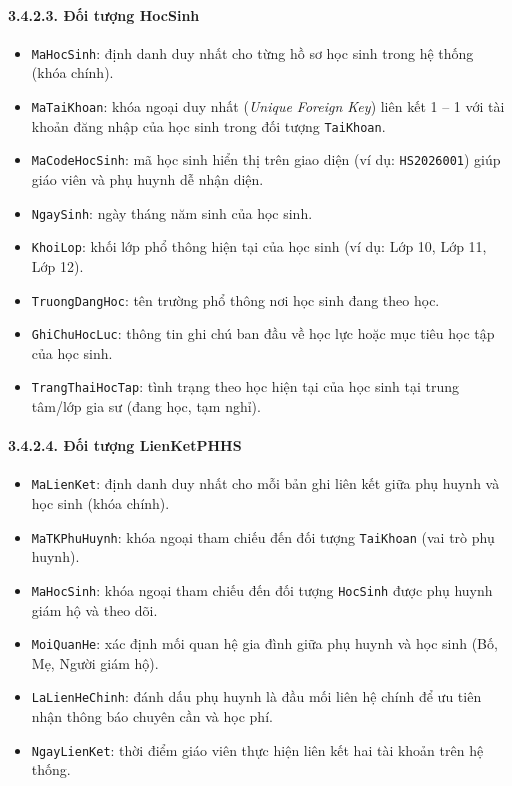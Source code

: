 \documentclass[12pt,a4paper]{article}
\begin{document}
\paragraph{3.4.2.3. Đối tượng HocSinh}\mbox{}
\begin{itemize}\setlength{\itemsep}{2pt}\setlength{\parskip}{0pt}
    \item \texttt{MaHocSinh}: định danh duy nhất cho từng hồ sơ học sinh trong hệ thống (khóa chính).
    \item \texttt{MaTaiKhoan}: khóa ngoại duy nhất (\textit{Unique Foreign Key}) liên kết 1 -- 1 với tài khoản đăng nhập của học sinh trong đối tượng \texttt{TaiKhoan}.
    \item \texttt{MaCodeHocSinh}: mã học sinh hiển thị trên giao diện (ví dụ: \texttt{HS2026001}) giúp giáo viên và phụ huynh dễ nhận diện.
    \item \texttt{NgaySinh}: ngày tháng năm sinh của học sinh.
    \item \texttt{KhoiLop}: khối lớp phổ thông hiện tại của học sinh (ví dụ: Lớp 10, Lớp 11, Lớp 12).
    \item \texttt{TruongDangHoc}: tên trường phổ thông nơi học sinh đang theo học.
    \item \texttt{GhiChuHocLuc}: thông tin ghi chú ban đầu về học lực hoặc mục tiêu học tập của học sinh.
    \item \texttt{TrangThaiHocTap}: tình trạng theo học hiện tại của học sinh tại trung tâm/lớp gia sư (đang học, tạm nghỉ).
\end{itemize}

\paragraph{3.4.2.4. Đối tượng LienKetPHHS}\mbox{}
\begin{itemize}\setlength{\itemsep}{2pt}\setlength{\parskip}{0pt}
    \item \texttt{MaLienKet}: định danh duy nhất cho mỗi bản ghi liên kết giữa phụ huynh và học sinh (khóa chính).
    \item \texttt{MaTKPhuHuynh}: khóa ngoại tham chiếu đến đối tượng \texttt{TaiKhoan} (vai trò phụ huynh).
    \item \texttt{MaHocSinh}: khóa ngoại tham chiếu đến đối tượng \texttt{HocSinh} được phụ huynh giám hộ và theo dõi.
    \item \texttt{MoiQuanHe}: xác định mối quan hệ gia đình giữa phụ huynh và học sinh (Bố, Mẹ, Người giám hộ).
    \item \texttt{LaLienHeChinh}: đánh dấu phụ huynh là đầu mối liên hệ chính để ưu tiên nhận thông báo chuyên cần và học phí.
    \item \texttt{NgayLienKet}: thời điểm giáo viên thực hiện liên kết hai tài khoản trên hệ thống.
\end{itemize}
\end{document}
